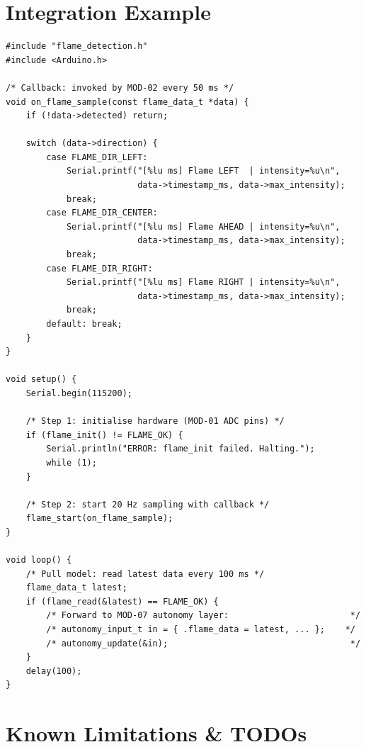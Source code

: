 \documentclass[12pt]{article}
\newcommand{\sectionrule}{%
  \vspace{2pt}{\color{headerblue}\rule{\linewidth}{1.5pt}}\vspace{6pt}}
\begin{document}
\section{Integration Example}
\sectionrule

\begin{lstlisting}[caption={Full MOD-02 integration with callback and error handling}]
#include "flame_detection.h"
#include <Arduino.h>

/* Callback: invoked by MOD-02 every 50 ms */
void on_flame_sample(const flame_data_t *data) {
    if (!data->detected) return;

    switch (data->direction) {
        case FLAME_DIR_LEFT:
            Serial.printf("[%lu ms] Flame LEFT  | intensity=%u\n",
                          data->timestamp_ms, data->max_intensity);
            break;
        case FLAME_DIR_CENTER:
            Serial.printf("[%lu ms] Flame AHEAD | intensity=%u\n",
                          data->timestamp_ms, data->max_intensity);
            break;
        case FLAME_DIR_RIGHT:
            Serial.printf("[%lu ms] Flame RIGHT | intensity=%u\n",
                          data->timestamp_ms, data->max_intensity);
            break;
        default: break;
    }
}

void setup() {
    Serial.begin(115200);

    /* Step 1: initialise hardware (MOD-01 ADC pins) */
    if (flame_init() != FLAME_OK) {
        Serial.println("ERROR: flame_init failed. Halting.");
        while (1);
    }

    /* Step 2: start 20 Hz sampling with callback */
    flame_start(on_flame_sample);
}

void loop() {
    /* Pull model: read latest data every 100 ms */
    flame_data_t latest;
    if (flame_read(&latest) == FLAME_OK) {
        /* Forward to MOD-07 autonomy layer:                        */
        /* autonomy_input_t in = { .flame_data = latest, ... };    */
        /* autonomy_update(&in);                                    */
    }
    delay(100);
}
\end{lstlisting}

\section{Known Limitations \& TODOs}
\sectionrule
\end{document}
